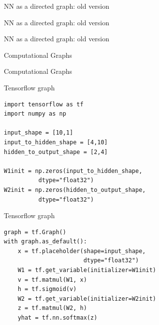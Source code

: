 \documentclass[10pt]{beamer}
\begin{document}
\begin{frame}[fragile]{NN as a directed graph: old version}

\end{frame}

\begin{frame}[fragile]{NN as a directed graph: old version}

\end{frame}

\begin{frame}[fragile]{NN as a directed graph: old version}
\begin{center}

\end{center}
\end{frame}

\begin{frame}[fragile]{Computational Graphs}

\end{frame}

\begin{frame}[fragile]{Computational Graphs}

\end{frame}



\begin{frame}[fragile]{Tensorflow graph}
\begin{verbatim}
import tensorflow as tf
import numpy as np

input_shape = [10,1]
input_to_hidden_shape = [4,10]
hidden_to_output_shape = [2,4]

W1init = np.zeros(input_to_hidden_shape,
          dtype="float32")
W2init = np.zeros(hidden_to_output_shape,
          dtype="float32")
\end{verbatim}
\end{frame}


\begin{frame}[fragile]{Tensorflow graph}
\begin{verbatim}
graph = tf.Graph() 
with graph.as_default():
    x = tf.placeholder(shape=input_shape,
                       dtype="float32") 
    W1 = tf.get_variable(initializer=W1init)
    v = tf.matmul(W1, x)
    h = tf.sigmoid(v)
    W2 = tf.get_variable(initializer=W2init)
    z = tf.matmul(W2, h)
    yhat = tf.nn.softmax(z)
\end{verbatim}
\end{frame}
\end{document}
